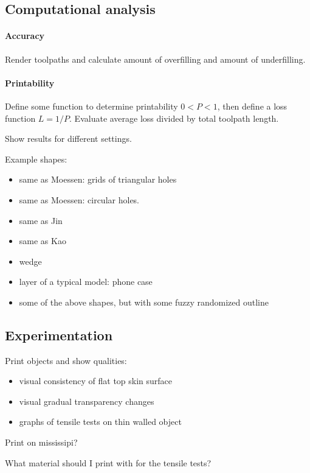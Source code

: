 \subsection{Computational analysis}
\paragraph{Accuracy}
Render toolpaths and calculate amount of overfilling and amount of underfilling.

\paragraph{Printability}
Define some function to determine printability $0<P<1$, 
then define a loss function $L = 1/P$.
Evaluate average loss divided by total toolpath length.


Show results for different settings.


Example shapes:
\begin{itemize}
\item same as Moessen: grids of triangular holes
\item same as Moessen: circular holes.
\item same as Jin 
\item same as Kao
\item wedge
\item layer of a typical model: phone case
\item some of the above shapes, but with some fuzzy randomized outline
\end{itemize}





\subsection{Experimentation}
Print objects and show qualities:
\begin{itemize}
\item visual consistency of flat top skin surface
\item visual gradual transparency changes
\item graphs of tensile tests on thin walled object
\end{itemize}

Print on mississipi?

What material should I print with for the tensile tests?









